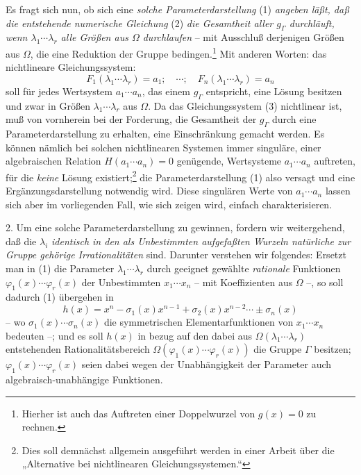 \documentclass[11pt]{article}
\begin{document}
Es fragt sich nun, ob sich eine \emph{solche Parameterdarstellung} (1) \emph{angeben läßt, daß die entstehende numerische Gleichung} (2) \emph{die Gesamtheit aller $g_\Gamma$ durchläuft, wenn $\lambda_1\cdots\lambda_r$ alle Größen aus $\Omega$ durchlaufen} -- mit Ausschluß derjenigen Größen aus $\Omega$, die eine Reduktion der Gruppe bedingen.\footnote{Hierher ist auch das Auftreten einer Doppelwurzel von $g(x)=0$ zu rechnen.} Mit anderen Worten: das nichtlineare Gleichungssystem:
\begin{equation}
 F_1(\lambda_1\cdots\lambda_r)=a_1;\quad \cdots;\quad F_n(\lambda_1\cdots\lambda_r)=a_n
\tag{3}
\end{equation}
soll für jedes Wertsystem $a_1\cdots a_n$, das einem $g_\Gamma$ entspricht, eine Lösung besitzen und zwar in Größen $\lambda_1\cdots\lambda_r$ aus $\Omega$. Da das Gleichungssystem (3) nichtlinear ist, muß von vornherein bei der Forderung, die Gesamtheit der $g_\Gamma$ durch eine Parameterdarstellung zu erhalten, eine Einschränkung gemacht werden. Es können nämlich bei solchen nichtlinearen Systemen immer singuläre, einer algebraischen Relation $H(a_1\cdots a_n)=0$ genügende, Wertsysteme $a_1\cdots a_n$ auftreten, für die \emph{keine} Lösung existiert;\footnote{Dies soll demnächst allgemein ausgeführt werden in einer Arbeit über die „Alternative bei nichtlinearen Gleichungssystemen.“} die Parameterdarstellung (1) also versagt und eine Ergänzungsdarstellung notwendig wird. Diese singulären Werte von $a_1\cdots a_n$ lassen sich aber im vorliegenden Fall, wie sich zeigen wird, einfach charakterisieren.

2. Um eine solche Parameterdarstellung zu gewinnen, fordern wir weitergehend, daß die $\lambda_i$ \emph{identisch in den als Unbestimmten aufgefaßten Wurzeln natürliche zur Gruppe gehörige Irrationalitäten} sind. Darunter verstehen wir folgendes: Ersetzt man in (1) die Parameter $\lambda_1\cdots\lambda_r$ durch geeignet gewählte \emph{rationale} Funktionen $\varphi_1(x)\cdots\varphi_r(x)$ der Unbestimmten $x_1\cdots x_n$ -- mit Koeffizienten aus $\Omega$ --, so soll dadurch (1) übergehen in
\begin{equation}
 h(x)=x^n-\sigma_1(x)x^{n-1}+\sigma_2(x)x^{n-2}\cdots\pm\sigma_n(x)
\tag{4}
\end{equation}
-- wo $\sigma_1(x)\cdots\sigma_n(x)$ die symmetrischen Elementarfunktionen von $x_1\cdots x_n$ bedeuten --; und es soll $h(x)$ in bezug auf den dabei aus $\Omega(\lambda_1\cdots\lambda_r)$ entstehenden Rationalitätsbereich $\Omega(\varphi_1(x)\cdots\varphi_r(x))$ die Gruppe $\Gamma$ besitzen; $\varphi_1(x)\cdots\varphi_r(x)$ seien dabei wegen der Unabhängigkeit der Parameter auch algebraisch-unabhängige Funktionen.
\end{document}
